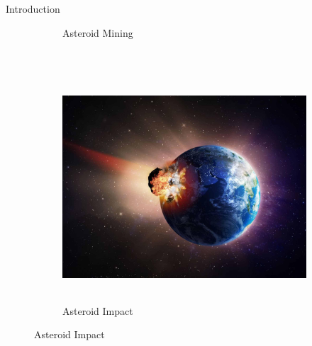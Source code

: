 \documentclass[final, usenames, dvipsnames]{beamer}
\newlength{\onecolwidth}
\begin{document}
\begin{frame}[t]
\begin{columns}[T,onlytextwidth]
\begin{column}{\onecolwidth}
\begin{block}{Introduction}
\begin{figure}
\begin{subfigure}[b]{0.4\columnwidth}
	        \caption*{Asteroid Mining}%
        \end{subfigure}~\hfill 
        \begin{subfigure}[b]{0.4\columnwidth}%
            \includegraphics[height=8.5cm]{figures/asteroid-alamy.jpg}%
            \caption*{Asteroid Impact}%
        \end{subfigure}%
        \hfill%
	\end{figure}
\end{block} %


\end{column}
\end{columns}
\end{frame}
\end{document}

